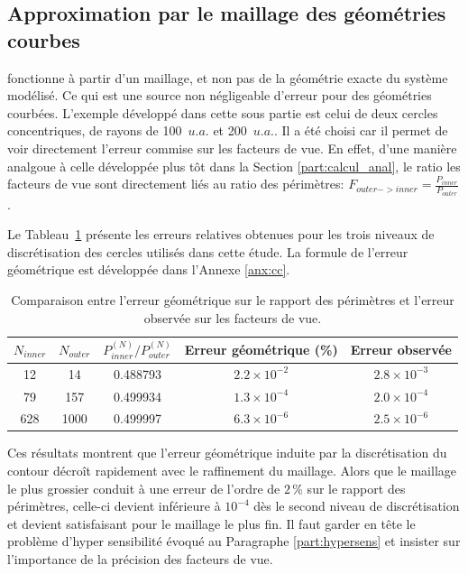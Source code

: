 \subsection{Approximation par le maillage des géométries courbes}
\ETT  fonctionne à partir d'un maillage, et non pas de la géométrie exacte du système modélisé. Ce qui est une source non négligeable d'erreur pour des géométries courbées. L'exemple développé dans cette sous partie est celui de deux cercles concentriques, de rayons de 100~$u.a.$ et 200~$u.a.$. Il a été choisi car il permet de voir directement l'erreur commise sur les facteurs de vue. En effet, d'une manière analgoue à celle développée plus tôt dans la Section \ref{part:calcul_anal}, le ratio les facteurs de vue sont directement liés au ratio des périmètres: $F_{outer -> inner}= \frac{P_{inner}}{P_{outer}}$. 


Le Tableau~\ref{tab:err_ratio_perimeter} présente les erreurs relatives obtenues pour les trois niveaux de discrétisation des cercles utilisés dans cette étude. La formule de l'erreur géométrique est développée dans l'Annexe \ref{anx:cc}.

\begin{table}[H]
\centering
\begin{tabular}{ccccc}
\toprule
$N_{inner}$ & $N_{outer}$ &
$P_ {inner}^{(N)}/P_{outer}^{(N)}$ &
Erreur géométrique (\%) &
Erreur observée \\
\midrule
12  & 14   & 0.488793 & $2.2\times10^{-2}$ & $2.8\times10^{-3}$ \\
79  & 157  & 0.499934 & $1.3\times10^{-4}$ & $2.0\times10^{-4}$ \\
628 & 1000 & 0.499997 & $6.3\times10^{-6}$ & $2.5\times10^{-6}$ \\
\bottomrule
\end{tabular}
\caption{Comparaison entre l'erreur géométrique sur le rapport des périmètres et l'erreur observée sur les facteurs de vue.}
\label{tab:err_ratio_perimeter}
\end{table}


Ces résultats montrent que l'erreur géométrique induite par la discrétisation du contour décroît rapidement avec le raffinement du maillage. Alors que le maillage le plus grossier conduit à une erreur de l'ordre de $2\,\%$ sur le rapport des périmètres, celle-ci devient inférieure à $10^{-4}$ dès le second niveau de discrétisation et devient satisfaisant pour le maillage le plus fin. Il faut garder en tête le problème d'hyper sensibilité évoqué au Paragraphe \ref{part:hypersens} et insister sur l'importance de la précision des facteurs de vue.




